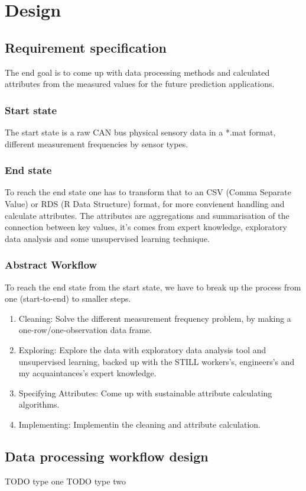 \chapter{Design}
\section{Requirement specification}
	\noindent
The end goal is to come up with data processing methods and calculated attributes from the measured values for the future prediction applications.
	\subsection{Start state}
The start state is a raw CAN bus physical sensory data in a *.mat format, different measurement frequencies by sensor types.

	\subsection{End state}
		\noindent
To reach the end state one has to transform that to an CSV (Comma Separate Value) or RDS (R Data Structure) format, for more convienent handling and calculate attributes.
		\noindent
The attributes are aggregations and summarisation of the connection between key values, it's comes from expert knowledge, exploratory data analysis and some unsupervised learning technique.	 \subsection{Abstract Workflow}
To reach the end state from the start state, we have to break up the process from one (start-to-end) to smaller steps.

\begin{enumerate}
	\item {Cleaning:} Solve the different measurement frequency problem, by making a one-row/one-observation data frame.
	\item {Exploring:} Explore the data with exploratory data analysis tool and unsupervised learning, backed up with the STILL workers's, engineers's and my acquaintances's expert knowledge.
 	\item {Specifying Attributes:} Come up with sustainable attribute calculating algorithms.
 	\item {Implementing:} Implementin the cleaning and attribute calculation.
\end{enumerate}

\section{Data processing workflow design}

TODO type one
TODO type two
